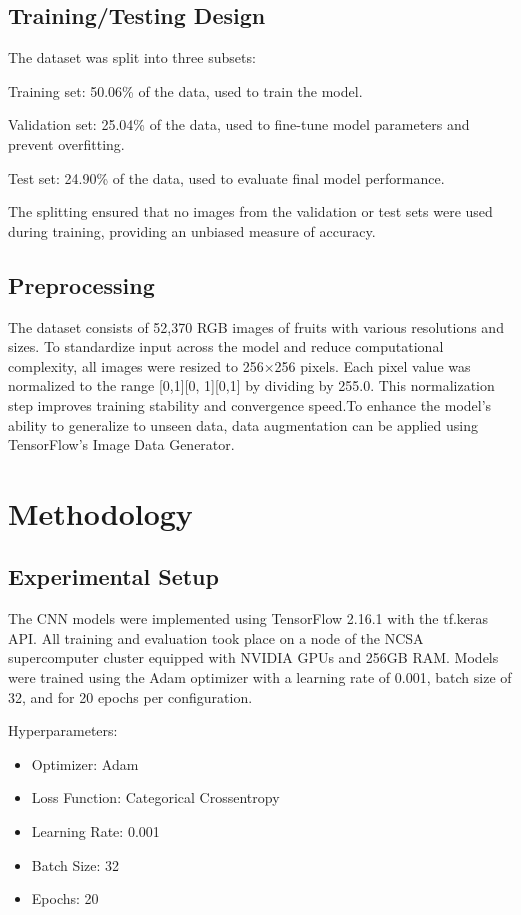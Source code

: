 \documentclass[conference]{IEEEtran}
\begin{document}
\subsection{Training/Testing Design}
The dataset was split into three subsets:

Training set: 50.06\% of the data, used to train the model.


Validation set: 25.04\% of the data, used to fine-tune model parameters and prevent overfitting.


Test set: 24.90\% of the data, used to evaluate final model performance.


The splitting ensured that no images from the validation or test sets were used during training, providing an unbiased measure of accuracy.
\subsection{Preprocessing}
The dataset consists of 52,370 RGB images of fruits with various resolutions and sizes. To standardize input across the model and reduce computational complexity, all images were resized to 256×256 pixels. Each pixel value was normalized to the range [0,1][0, 1][0,1] by dividing by 255.0. This normalization step improves training stability and convergence speed.To enhance the model’s ability to generalize to unseen data, data augmentation can be applied using TensorFlow’s Image Data Generator.
\section{Methodology}

\subsection{Experimental Setup}
The CNN models were implemented using TensorFlow 2.16.1 with the tf.keras API. All training and evaluation took place on a node of the NCSA supercomputer cluster equipped with NVIDIA GPUs and 256GB RAM. Models were trained using the Adam optimizer with a learning rate of 0.001, batch size of 32, and for 20 epochs per configuration.

Hyperparameters:
\begin{itemize}
  \item Optimizer: Adam
  \item Loss Function: Categorical Crossentropy
  \item Learning Rate: 0.001
  \item Batch Size: 32
  \item Epochs: 20
\end{itemize}
\end{document}
